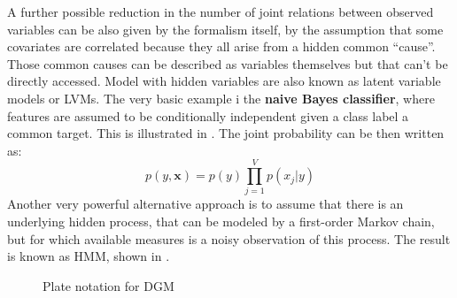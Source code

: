 A further possible reduction in the number of joint relations between observed variables can be also given by the formalism itself,  by the assumption that some covariates are correlated because they all arise from a hidden common “cause”. Those common causes can be described as variables themselves but that can't be directly accessed.  Model with hidden variables are also known as latent variable models or LVMs. 
The very basic example i the \textbf{naive Bayes classifier}, where features are assumed to be conditionally independent given a class label a common target. This is illustrated in \Figure{\ref{fig:naive_bayes}}. The joint probability can be then written as:
\begin{equation}
    p(y,\bm{x}) = p(y) \prod_{j=1}^V p(x_j| y)
\end{equation}
%
Another very powerful alternative approach is to assume that there is an underlying hidden process, that can be modeled by a first-order Markov chain, but for which available measures is a noisy observation of this process. The result is known as \acl{HMM}, shown in \Figure{\ref{fig:hidden_markov}}. 


\begin{figure}
    \centering
    \caption{ Plate notation for DGM }
    \label{fig:plate_notation}
\end{figure}






